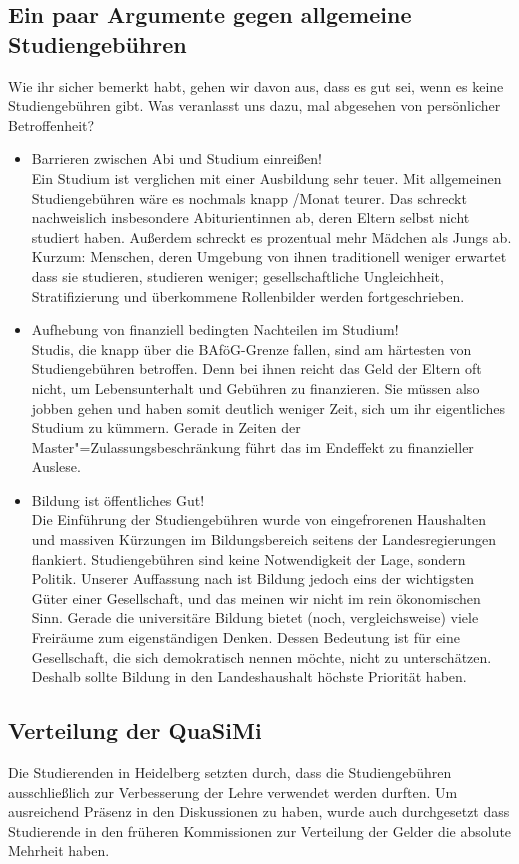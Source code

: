 \subsection{Ein paar Argumente gegen allgemeine \\Studiengebühren}
Wie ihr sicher bemerkt habt, gehen wir davon aus, dass es gut sei, wenn es keine Studiengebühren gibt. Was veranlasst uns dazu, mal abgesehen von persönlicher Betroffenheit?
\begin{itemize}
\item {Barrieren zwischen Abi und Studium einreißen!}\\
	Ein Studium ist verglichen mit einer Ausbildung sehr teuer. Mit allgemeinen Studiengebühren wäre es nochmals knapp /Monat teurer. Das schreckt nachweislich insbesondere Abiturientinnen ab, deren Eltern selbst nicht studiert haben. Außerdem schreckt es prozentual mehr Mädchen als Jungs ab. Kurzum: Menschen, deren Umgebung von ihnen traditionell weniger erwartet dass sie studieren, studieren weniger; gesellschaftliche Ungleichheit, Stratifizierung und überkommene Rollenbilder werden fortgeschrieben.
\item {Aufhebung von finanziell bedingten Nachteilen im Studium!}\\
	Studis, die knapp über die BAföG-Grenze fallen, sind am härtesten von Studiengebühren betroffen. Denn bei ihnen reicht das Geld der Eltern oft nicht, um Lebensunterhalt und Gebühren zu finanzieren. Sie müssen also jobben gehen und haben somit deutlich weniger Zeit, sich um ihr eigentliches Studium zu kümmern. Gerade in Zeiten der Master"=Zulassungsbeschränkung führt das im Endeffekt zu finanzieller Auslese.
\item {Bildung ist öffentliches Gut!}\\
	Die Einführung der Studiengebühren wurde von eingefrorenen Haushalten und massiven Kürzungen im Bildungsbereich seitens der Landesregierungen flankiert. Studiengebühren sind keine Notwendigkeit der Lage, sondern Politik. Unserer Auffassung nach ist Bildung jedoch eins der wichtigsten Güter einer Gesellschaft, und das meinen wir nicht im rein ökonomischen Sinn. Gerade die universitäre Bildung bietet (noch, vergleichsweise) viele Freiräume zum eigenständigen Denken. Dessen Bedeutung ist für eine Gesellschaft, die sich demokratisch nennen möchte, nicht zu unterschätzen. Deshalb sollte Bildung in den Landeshaushalt höchste Priorität haben.
\end{itemize}

\subsection{Verteilung der QuaSiMi}
Die Studierenden in Heidelberg setzten durch, dass die Studiengebühren ausschließlich zur Verbesserung der Lehre verwendet werden durften. Um ausreichend Präsenz in den Diskussionen zu haben, wurde auch durchgesetzt dass Studierende in den früheren Kommissionen zur Verteilung der Gelder die absolute Mehrheit haben. 

